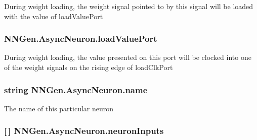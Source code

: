 During weight loading, the weight signal pointed to by this signal will be loaded with the value of load\+Value\+Port 

\hypertarget{class_n_n_gen_1_1_async_neuron_a765bcf8344758b0e967117390749882d}{}
\subsubsection[{load\+Value\+Port}]{ N\+N\+Gen.\+Async\+Neuron.\+load\+Value\+Port\hspace{0.3cm}{\ttfamily [get]}}\label{class_n_n_gen_1_1_async_neuron_a765bcf8344758b0e967117390749882d}


During weight loading, the value presented on this port will be clocked into one of the weight signals on the rising edge of load\+Clk\+Port 

\hypertarget{class_n_n_gen_1_1_async_neuron_a1b216c193a13ad763fee071d3238aab1}{}
\subsubsection[{name}]{\setlength{\rightskip}{0pt plus 5cm}string N\+N\+Gen.\+Async\+Neuron.\+name\hspace{0.3cm}{\ttfamily [get]}}\label{class_n_n_gen_1_1_async_neuron_a1b216c193a13ad763fee071d3238aab1}


The name of this particular neuron 

\hypertarget{class_n_n_gen_1_1_async_neuron_ae248edac3250fffe3fdba7ff2dd8288b}{}
\subsubsection[{neuron\+Inputs}]{ \mbox{[}$\,$\mbox{]} N\+N\+Gen.\+Async\+Neuron.\+neuron\+Inputs\hspace{0.3cm}{\ttfamily [get]}}\label{class_n_n_gen_1_1_async_neuron_ae248edac3250fffe3fdba7ff2dd8288b}


